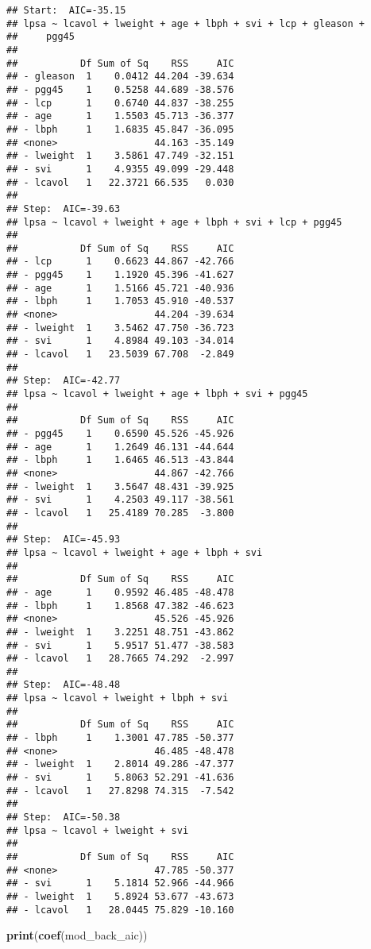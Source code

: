 \documentclass[
]{article}
\newenvironment{Shaded}{\begin{snugshade}}{\end{snugshade}}
\newcommand{\FunctionTok}[1]{\textcolor[rgb]{0.13,0.29,0.53}{\textbf{#1}}}
\newcommand{\NormalTok}[1]{#1}
\begin{document}
\begin{enumerate}
\begin{verbatim}
## Start:  AIC=-35.15
## lpsa ~ lcavol + lweight + age + lbph + svi + lcp + gleason + 
##     pgg45
## 
##           Df Sum of Sq    RSS     AIC
## - gleason  1    0.0412 44.204 -39.634
## - pgg45    1    0.5258 44.689 -38.576
## - lcp      1    0.6740 44.837 -38.255
## - age      1    1.5503 45.713 -36.377
## - lbph     1    1.6835 45.847 -36.095
## <none>                 44.163 -35.149
## - lweight  1    3.5861 47.749 -32.151
## - svi      1    4.9355 49.099 -29.448
## - lcavol   1   22.3721 66.535   0.030
## 
## Step:  AIC=-39.63
## lpsa ~ lcavol + lweight + age + lbph + svi + lcp + pgg45
## 
##           Df Sum of Sq    RSS     AIC
## - lcp      1    0.6623 44.867 -42.766
## - pgg45    1    1.1920 45.396 -41.627
## - age      1    1.5166 45.721 -40.936
## - lbph     1    1.7053 45.910 -40.537
## <none>                 44.204 -39.634
## - lweight  1    3.5462 47.750 -36.723
## - svi      1    4.8984 49.103 -34.014
## - lcavol   1   23.5039 67.708  -2.849
## 
## Step:  AIC=-42.77
## lpsa ~ lcavol + lweight + age + lbph + svi + pgg45
## 
##           Df Sum of Sq    RSS     AIC
## - pgg45    1    0.6590 45.526 -45.926
## - age      1    1.2649 46.131 -44.644
## - lbph     1    1.6465 46.513 -43.844
## <none>                 44.867 -42.766
## - lweight  1    3.5647 48.431 -39.925
## - svi      1    4.2503 49.117 -38.561
## - lcavol   1   25.4189 70.285  -3.800
## 
## Step:  AIC=-45.93
## lpsa ~ lcavol + lweight + age + lbph + svi
## 
##           Df Sum of Sq    RSS     AIC
## - age      1    0.9592 46.485 -48.478
## - lbph     1    1.8568 47.382 -46.623
## <none>                 45.526 -45.926
## - lweight  1    3.2251 48.751 -43.862
## - svi      1    5.9517 51.477 -38.583
## - lcavol   1   28.7665 74.292  -2.997
## 
## Step:  AIC=-48.48
## lpsa ~ lcavol + lweight + lbph + svi
## 
##           Df Sum of Sq    RSS     AIC
## - lbph     1    1.3001 47.785 -50.377
## <none>                 46.485 -48.478
## - lweight  1    2.8014 49.286 -47.377
## - svi      1    5.8063 52.291 -41.636
## - lcavol   1   27.8298 74.315  -7.542
## 
## Step:  AIC=-50.38
## lpsa ~ lcavol + lweight + svi
## 
##           Df Sum of Sq    RSS     AIC
## <none>                 47.785 -50.377
## - svi      1    5.1814 52.966 -44.966
## - lweight  1    5.8924 53.677 -43.673
## - lcavol   1   28.0445 75.829 -10.160
\end{verbatim}

\begin{Shaded}
\begin{Highlighting}[]
\FunctionTok{print}\NormalTok{(}\FunctionTok{coef}\NormalTok{(mod\_back\_aic))}
\end{Highlighting}
\end{Shaded}


\end{enumerate}
\end{document}
